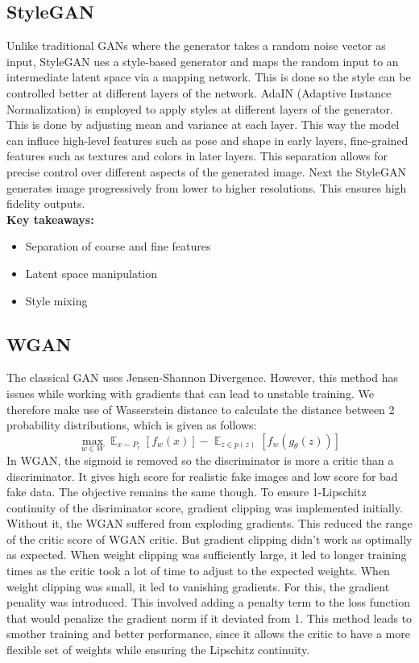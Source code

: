 \documentclass{article}
\newcommand{\E}{\mathop{\mathbb{E}}}
\begin{document}
\subsection{StyleGAN}
Unlike traditional GANs where the generator takes a random noise vector as input, StyleGAN ues a style-based generator
and maps the random input to an intermediate latent space via a mapping network. This is done so the style can be controlled
better at different layers of the network. AdaIN (Adaptive Instance Normalization) is employed to apply styles at different layers of the generator.
This is done by adjusting mean and variance at each layer. This way the model can influce high-level features such as pose
and shape in early layers, fine-grained features such as textures and colors in later layers. This separation allows for precise
control over different aspects of the generated image. Next the StyleGAN generates image progressively from lower to higher 
resolutions. This ensures high fidelity outputs.\\
\textbf{Key takeaways:}\\
\begin{itemize}
	\item Separation of coarse and fine features
	\item Latent space manipulation
	\item Style mixing
\end{itemize}
\subsection{WGAN}
The classical GAN uses Jensen-Shannon Divergence. However, this method has issues while working with gradients that can
lead to unstable training. We therefore make use of Wasserstein distance to calculate the distance between 2 probability
distributions, which is given as follows:\\
$$\mathop{max}_{w \in W} \E_{x \sim P_r}[f_w(x)] - \E_{z \in p(z)}[f_w(g_\theta(z))]$$
In WGAN, the sigmoid is removed so the discriminator is more a critic than a discriminator. It gives high score
for realistic fake images and low score for bad fake data. The objective remains the same though. To ensure 1-Lipschitz
continuity of the disriminator score, gradient clipping was implemented initially. Without it, the WGAN suffered
from exploding gradients. This reduced the range of the critic score of WGAN critic. But gradient clipping didn't work
as optimally as expected. When weight clipping was sufficiently large, it led to longer training times as the critic
took a lot of time to adjust to the expected weights. When weight clipping was small, it led to vanishing gradients. For this,
the gradient penality was introduced. This involved adding a penalty term to the loss function that would penalize
the gradient norm if it deviated from 1. This method leads to smother training and better performance, since it allows the critic to have a more flexible
set of weights while ensuring the Lipschitz continuity.
\clearpage
\end{document}
